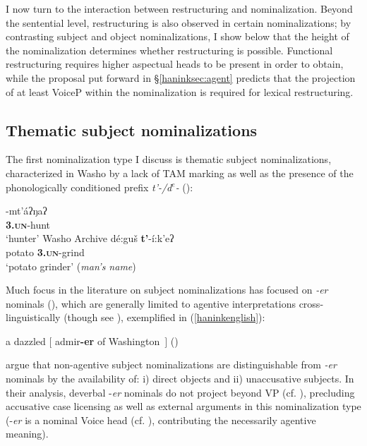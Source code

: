 \documentclass[output=paper]{langscibook}
\begin{document}
I now turn to the interaction between restructuring and nominalization. Beyond the sentential level, restructuring is also observed in certain nominalizations; by contrasting subject and object nominalizations, I show below  that the height of the nominalization determines whether restructuring is possible. Functional restructuring requires higher aspectual heads to be present in order to obtain, while the proposal put forward in \S\ref{haninksec:agent} predicts that the projection of at least VoiceP  within the nominalization is required for lexical restructuring. %

\subsection{Thematic subject nominalizations}

The first nominalization type I discuss is thematic subject nominalizations, characterized in Washo by a lack of TAM marking as well as the presence of the phonologically conditioned prefix {\itshape t'-/d$^e$-} (\citealt{jacobsen1964}):

\ea {}-mt'áʔŋaʔ\\
\textbf{\textsc{3.un}}-hunt\\
\glt `hunter' \hfill Washo Archive
\ex \gll dé:guš {\bfseries t'}-í:k'eʔ\\
potato \textbf{\textsc{3.un}}-grind\\
\glt `potato grinder' ({\itshape man's name}) \hfill \citep[354]{jacobsen1964}
\z
\z

Much focus in the literature on subject nominalizations has focused on {\itshape -er} nominals (\citealt{rappaporthovavlevin1992,bakervinokurova2009,alexiadouschafer2010}), which are generally limited to agentive interpretations cross-linguistically (though see \citealt{alexiadouschafer2008,alexiadouschafer2010}), exemplified in (\ref{haninkenglish}):

\ea a dazzled $[$ admir{\bfseries -er} of Washington\ $]$  \hfill (\citealt{rappaporthovavlevin1992})\label{haninkenglish}
\z 



\noindent\cite{bakervinokurova2009} argue that non-agentive subject nominalizations are distinguishable from {\itshape -er} nominals by the availability of: i) direct objects and ii) unaccusative subjects. In their analysis, deverbal -{\itshape er} nominals do not project beyond VP (cf. \citealt{alexiadouschafer2010}), precluding accusative case licensing as well as external arguments in this nominalization type  (-{\itshape er} is a nominal Voice head (cf. \citealt{kratzer1996}), contributing the necessarily agentive meaning). 
\end{document}
